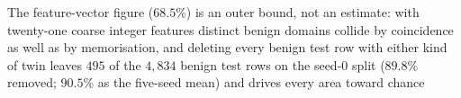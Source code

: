 The feature-vector figure ($68.5\%$) is an outer bound, not an estimate: with twenty-one coarse integer features distinct benign domains collide by coincidence as well as by memorisation, and deleting every benign test row with either kind of twin leaves $495$ of the $4{,}834$ benign test rows on the seed-0 split ($89.8\%$ removed; $90.5\%$ as the five-seed mean) and drives every area toward chance%
